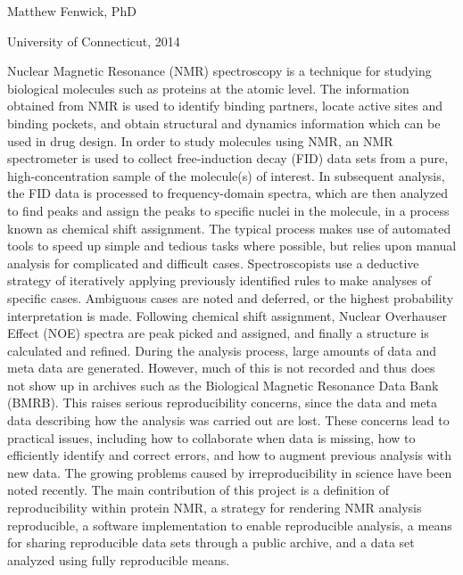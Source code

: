 \pagestyle{myabstract} %
\thispagestyle{empty} %

\begin{center}
  {\LARGE \mattftitle{}}
  
  \vspace{2cm}

  Matthew Fenwick, PhD
  
  \vspace{0.5cm}

  University of Connecticut, 2014
  
  \vspace{1in}
\end{center}

\thispagestyle{empty}
Nuclear Magnetic Resonance (NMR) spectroscopy is a technique for studying 
biological molecules such as proteins at the atomic level.  
The information obtained from NMR is used to identify 
binding partners, locate active sites and binding pockets, and obtain 
structural and dynamics information which can be used in drug design.  In 
order to study molecules using NMR, an NMR spectrometer is used to collect 
free-induction decay (FID) data sets from a pure, high-concentration sample 
of the molecule(s) of interest.  In subsequent analysis, the FID data is 
processed to frequency-domain spectra, which are then analyzed to find peaks 
and assign the peaks to specific nuclei in the molecule, in a process known as 
chemical shift assignment.  The typical process makes use of automated tools to 
speed up simple and tedious tasks where possible, but relies upon manual 
analysis for complicated and difficult cases.  Spectroscopists use a deductive 
strategy of iteratively applying previously identified rules to make analyses 
of specific cases.  Ambiguous cases are noted and deferred, or the highest 
probability interpretation is made.  Following chemical shift assignment, 
Nuclear Overhauser Effect (NOE) spectra are peak picked and assigned, and 
finally a structure is calculated and refined.  
During the analysis process, large amounts of data and meta data are generated.  
However, much of this is not recorded and thus does not show up in archives 
such as the Biological Magnetic Resonance Data Bank (BMRB).
This raises serious 
reproducibility concerns, since the data and meta data describing how the 
analysis was carried out are lost.  These concerns lead to practical issues,
including how to collaborate when data is missing, how to efficiently identify 
and correct errors, and how to augment previous analysis with new data.
The growing problems caused by irreproducibility in science have been noted 
recently.  The main contribution of this project is a definition of 
reproducibility within protein NMR, a strategy for rendering NMR analysis 
reproducible, a software implementation to enable reproducible analysis, a 
means for sharing reproducible data sets through a public archive, and a data 
set analyzed using fully reproducible means.

\clearpage
\pagestyle{plain}

